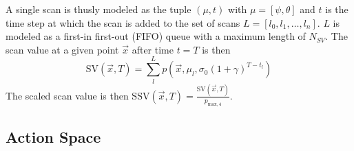 
A single scan is thusly modeled as the tuple $(\mu, t)$ with $\mu = [\psi,\theta]$ and $t$ is the time step at which the scan is added to the set of scans $L = [l_0,l_1,\dots,l_n]$. $L$ is modeled as a first-in first-out (FIFO) queue with a maximum length of $N_{SV}$. The scan value at a given point $\vec x$ after time $t=T$ is then 
\begin{equation}
    \mathrm{SV}(\vec x, T) = \sum^L_l p(\vec x, \mu_l, \sigma_0(1+\gamma)^{T-t_l})
\end{equation}
The scaled scan value is then $\mathrm{SSV}(\vec x, T) = \frac{\mathrm{SV}(\vec x, T)}{p_{\mathrm{max}, 4}}$.


\subsection{Action Space}

